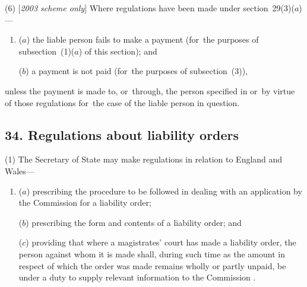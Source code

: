 \documentclass[12pt,a4paper]{article}
\begin{document}
(6) [\emph{2003 scheme only}] Where regulations have been made under section~29(3)($a$)—
\begin{enumerate}\item[]
($a$) the liable person fails to make a payment (for~the purposes of subsection~(1)($a$)  of this section); and

($b$) a payment is not paid (for~the purposes of subsection~(3)),
\end{enumerate}
unless the payment is made to, or~through, the person specified in or~by virtue of those regulations for~the case of the liable person in question.


\subsection{34. Regulations about liability orders}

(1) The Secretary of State may make regulations in relation to England and Wales—
\begin{enumerate}\item[]
($a$) prescribing the procedure to be followed in dealing with an application by the 
Commission  %
for a liability order;

($b$) prescribing the form and contents of a liability order; and

($c$) providing that where a magistrates' court has made a liability order, the person against whom it is made shall, during such time as the amount in respect of which the order was made remains wholly or partly unpaid, be under a duty to supply relevant information to the 
Commission%
.
\end{enumerate}
\end{document}
